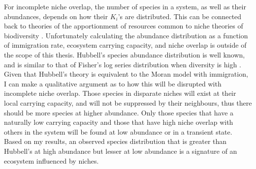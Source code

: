 
For incomplete niche overlap, the number of species in a system, as well as their abundances, depends on how their $K_i$'s are distributed. 
This can be connected back to theories of the apportionment of resources common to niche theories of biodiversity \cite{}. 
Unfortunately calculating the abundance distribution as a function of immigration rate, ecosystem carrying capacity, and niche overlap is outside of the scope of this thesis. 
Hubbell's species abundance distribution is well known, and is similar to that of Fisher's log series distribution when diversity is high \cite{Fisher1943,Alonso2004}. 
Given that Hubbell's theory is equivalent to the Moran model with immigration, I can make a qualitative argument as to how this will be disrupted with incomplete niche overlap. 
Those species in disparate niches will exist at their local carrying capacity, and will not be suppressed by their neighbours, thus there should be more species at higher abundance. 
Only those species that have a naturally low carrying capacity and those that have high niche overlap with others in the system will be found at low abundance or in a transient state. 
Based on my results, an observed species distribution that is greater than Hubbell's at high abundance but lesser at low abundance is a signature of an ecosystem influenced by niches. 
